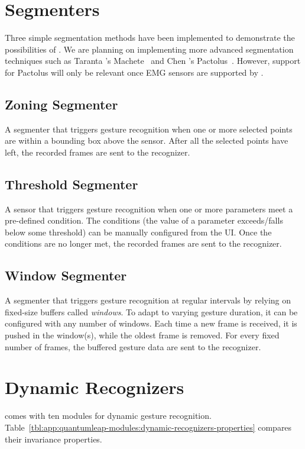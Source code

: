 \section{Segmenters} \label{app:quantumleap-modules:segmenters}
Three simple segmentation methods have been implemented to demonstrate the possibilities of \ql. We are planning on implementing more advanced segmentation techniques such as Taranta \etal's Machete~\cite{Taranta:2021} and Chen \etal's Pactolus~\cite{Chen:2016}. However, support for Pactolus will only be relevant once EMG sensors are supported by \ql.

\subsection{Zoning Segmenter}
A segmenter that triggers gesture recognition when one or more selected points are within a bounding box above the sensor. After all the selected points have left, the recorded frames are sent to the recognizer.

\subsection{Threshold Segmenter}
A sensor that triggers gesture recognition when one or more parameters meet a pre-defined condition. The conditions (\eg the value of a parameter exceeds/falls below some threshold) can be manually configured from the UI. Once the conditions are no longer met, the recorded frames are sent to the recognizer.

\subsection{Window Segmenter}
A segmenter that triggers gesture recognition at regular intervals by relying on fixed-size buffers called \textit{windows}. To adapt to varying gesture duration, it can be configured with any number of windows. Each time a new frame is received, it is pushed in the window(s), while the oldest frame is removed. For every fixed number of frames, the buffered gesture data are sent to the recognizer.

\section{Dynamic Recognizers} \label{app:quantumleap-modules:dynamic-recognizers}
\ql comes with ten modules for dynamic gesture recognition. Table~\ref{tbl:app:quantumleap-modules:dynamic-recognizers-properties} compares their invariance properties.

